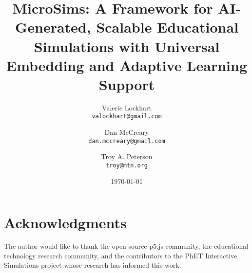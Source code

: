 \documentclass[11pt]{article}
\title{MicroSims: A Framework for AI-Generated, Scalable Educational Simulations with Universal Embedding and Adaptive Learning Support}
\author{
    Valerie Lockhart \\
    \texttt{valockhart@gmail.com}
    \and
    Dan McCreary \\
    \texttt{dan.mccreary@gmail.com}
    \and
    Troy A. Peterson \\
    \texttt{troy@mtn.org}
}
\date{\today}
\begin{document}
\maketitle














\section*{Acknowledgments}
The author would like to thank the open-source p5.js community, the educational technology research community, and the contributors to the PhET Interactive Simulations project whose research has informed this work.



\end{document}
